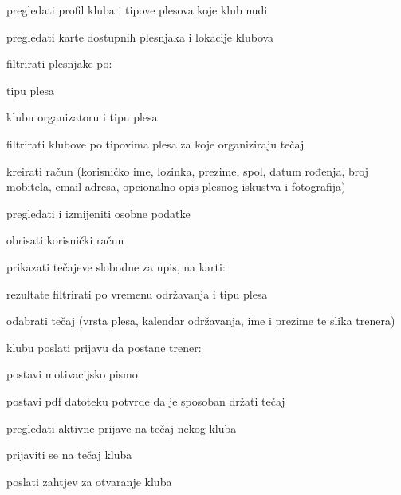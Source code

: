 			\begin{packed_enum}
				\item  {}
				
				\begin{packed_enum}
					
					\item pregledati profil kluba i tipove plesova koje klub nudi
					\item pregledati karte dostupnih plesnjaka i lokacije klubova
					\item filtrirati plesnjake po:
					\begin{packed_enum}
						
						\item  tipu plesa
						\item  klubu organizatoru i tipu plesa
				
					\end{packed_enum}
					\item  filtrirati klubove po tipovima plesa za koje organiziraju tečaj
					\item kreirati račun (korisničko ime, lozinka, prezime, spol, datum rođenja, broj mobitela, email adresa, opcionalno opis plesnog iskustva i fotografija)
						
				\end{packed_enum}
			\bigskip
			\bigskip
			\bigskip
			\bigskip
			\bigskip
			\bigskip
			\bigskip
			\bigskip
			\bigskip
			

				\item \underbar{Klijent (inicijator) može:}
				
				\begin{packed_enum}
					\item pregledati i izmijeniti osobne podatke
					\item obrisati korisnički račun
					\item prikazati tečajeve slobodne za upis, na karti:
					\begin{packed_enum}
						\item rezultate filtrirati po vremenu održavanja i tipu plesa
					\end{packed_enum}
					\item odabrati tečaj (vrsta plesa, kalendar održavanja, ime i prezime te slika trenera)
					\item klubu poslati prijavu da postane trener:
					\begin{packed_enum}
						\item postavi motivacijsko pismo
						\item postavi pdf datoteku potvrde da je sposoban držati tečaj
					\end{packed_enum}
					\item pregledati aktivne prijave na tečaj nekog kluba
					\item prijaviti se na tečaj kluba
					\item poslati zahtjev za otvaranje kluba
				\end{packed_enum}
			\bigskip
			\bigskip
				

\end{packed_enum}
